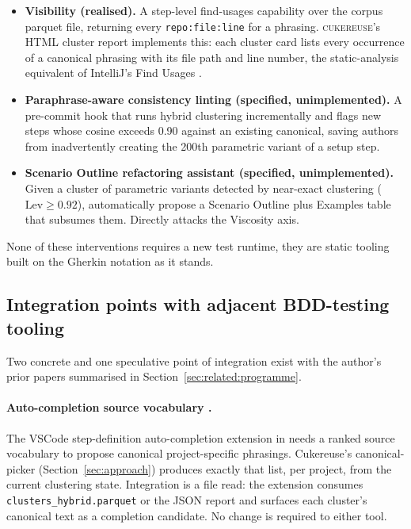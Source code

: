\documentclass[11pt,a4paper]{article}
\newcommand{\tool}{\textsc{cukereuse}\xspace}
\begin{document}
\begin{itemize}[leftmargin=2em]
\item \textbf{Visibility (realised).} A step-level find-usages
      capability over the corpus parquet file, returning every
      \texttt{repo:file:line} for a phrasing. \tool's HTML cluster
      report implements this: each cluster card lists every
      occurrence of a canonical phrasing with its file path and line
      number, the static-analysis equivalent of IntelliJ's Find
      Usages \citep{intellij2024findusages}.
\item \textbf{Paraphrase-aware consistency linting (specified,
      unimplemented).} A pre-commit hook that runs hybrid clustering
      incrementally and flags new steps whose cosine exceeds 0.90
      against an existing canonical, saving authors from
      inadvertently creating the 200th parametric variant of a setup
      step.
\item \textbf{Scenario Outline refactoring assistant (specified,
      unimplemented).} Given a cluster of parametric variants detected
      by near-exact clustering (\(\mathrm{Lev}\geq 0.92\)),
      automatically propose a Scenario Outline plus Examples table
      that subsumes them. Directly attacks the Viscosity axis.
\end{itemize}

None of these interventions requires a new test runtime, they are
static tooling built on the Gherkin notation as it stands.

\subsection{Integration points with adjacent BDD-testing tooling}
\label{sec:discussion:integration}

Two concrete and one speculative point of integration exist with
the author's prior papers summarised in
Section~\ref{sec:related:programme}.

\paragraph{Auto-completion source vocabulary
\citep{mughal2024bdd}.} The VSCode step-definition auto-completion
extension in \citet{mughal2024bdd} needs a ranked source vocabulary
to propose canonical project-specific phrasings. Cukereuse's
canonical-picker (Section~\ref{sec:approach}) produces exactly that
list, per project, from the current clustering state. Integration
is a file read: the extension consumes
\texttt{clusters\_hybrid.parquet} or the JSON report and surfaces
each cluster's canonical text as a completion candidate. No change
is required to either tool.
\end{document}

